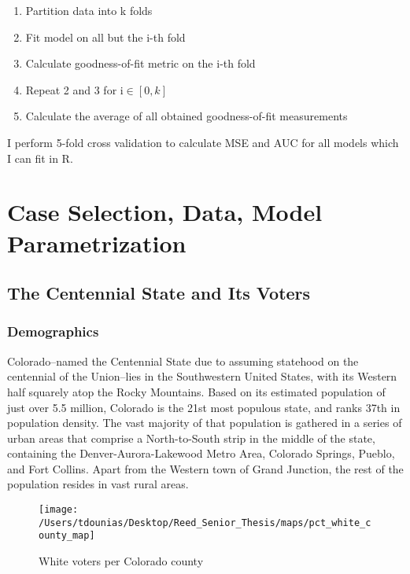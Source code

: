 \documentclass[12pt,twoside]{reedthesis}
\begin{document}
  \begin{enumerate}
  \item Partition data into k folds
  \item Fit model on all but the i-th fold
  \item Calculate goodness-of-fit metric on the i-th fold
  \item Repeat 2 and 3 for i$\in [0,k]$
  \item Calculate the average of all obtained goodness-of-fit measurements
  \end{enumerate}
  
  I perform 5-fold cross validation to calculate MSE and AUC for all
  models which I can fit in R.
  
  \chapter{Case Selection, Data, Model
  Parametrization}\label{case-selection-data-model-parametrization}
  
  \section{The Centennial State and Its
  Voters}\label{the-centennial-state-and-its-voters}
  
  \subsection{Demographics}\label{demographics}
  
  Colorado--named the Centennial State due to assuming statehood on the
  centennial of the Union--lies in the Southwestern United States, with
  its Western half squarely atop the Rocky Mountains. Based on its
  estimated population of just over 5.5 million, Colorado is the 21st most
  populous state, and ranks 37th in population density. The vast majority
  of that population is gathered in a series of urban areas that comprise
  a North-to-South strip in the middle of the state, containing the
  Denver-Aurora-Lakewood Metro Area, Colorado Springs, Pueblo, and Fort
  Collins. Apart from the Western town of Grand Junction, the rest of the
  population resides in vast rural areas.
  
  \begin{figure}
  
  {\centering \texttt{[image: /Users/tdounias/Desktop/Reed\_Senior\_Thesis/maps/pct\_white\_county\_map]} 
  
  }
  
  \caption[White voters per Colorado county]{White voters per Colorado county}\label{fig:white pct map}
  \end{figure}
  
\end{document}
